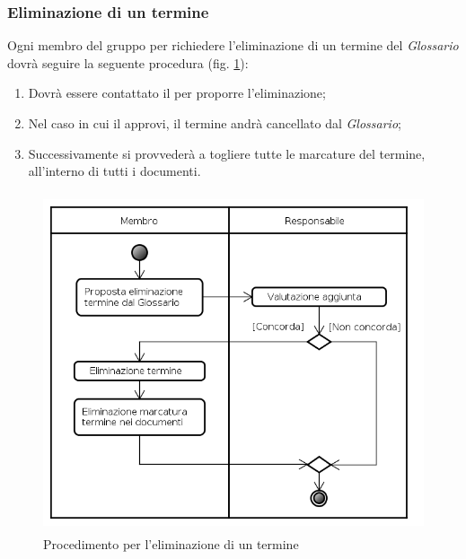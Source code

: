\subsubsection{Eliminazione di un termine}
\label{el_termini}
Ogni membro del gruppo per richiedere l'eliminazione di un termine del \emph{Glossario} dovrà seguire la seguente procedura (fig. \ref{proc_eliminazione}):
\begin{enumerate}
\item Dovrà essere contattato il \projectManager{} per proporre l'eliminazione;
\item Nel caso in cui il \projectManager{} approvi, il termine andrà cancellato dal \emph{Glossario};
\item Successivamente si provvederà a togliere tutte le marcature del termine, all'interno di tutti i documenti.
\end{enumerate}
\pagebreak
\begin{figure}[!h]
\centering
\includegraphics [height=10cm]{./content/Immagini/Eliminazione_Termine.png}
\caption{Procedimento per l'eliminazione di un termine}
\label{proc_eliminazione}
\end{figure}

